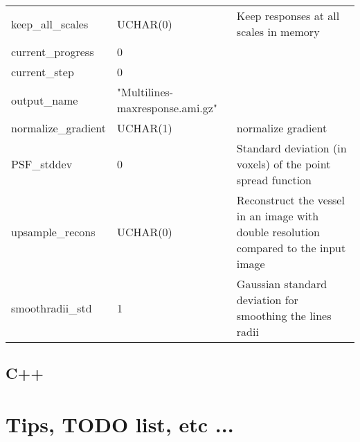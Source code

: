 \documentclass{article}
\begin{document}
\begin{tabular}{lll}
    keep\_all\_scales   & UCHAR(0) & Keep responses at all scales in memory\\
    current\_progress  & 0\\
    current\_step      & 0\\
    output\_name       & "Multilines-maxresponse.ami.gz"\\
    normalize\_gradient & UCHAR(1) & normalize gradient\\
    PSF\_stddev         & 0 & Standard deviation (in voxels) of the point spread function\\
    upsample\_recons & UCHAR(0)& Reconstruct the vessel in an image with double resolution compared to the input image\\
    smoothradii\_std & 1& Gaussian standard deviation for smoothing the lines radii\\
%  
  \hline
\end{tabular}

\subsection{C++}

\section{Tips, TODO list, etc ...}



\end{document}
